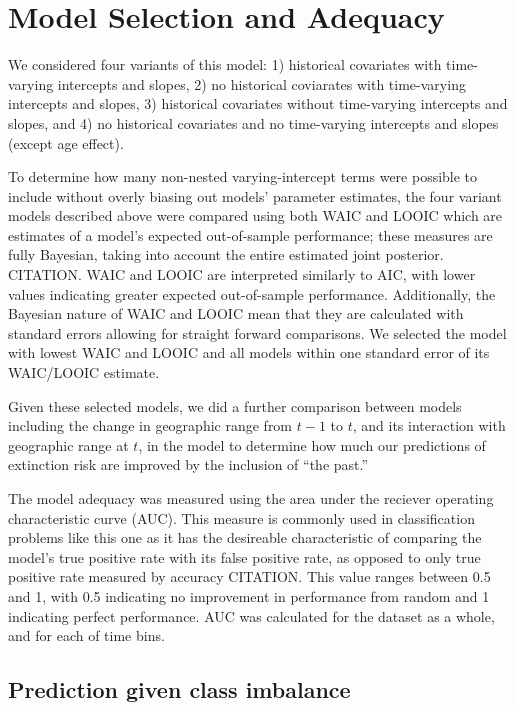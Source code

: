 \documentclass[12pt,letterpaper]{article}
\begin{document}
\section{Model Selection and Adequacy}

We considered four variants of this model: 1) historical covariates with time-varying intercepts and slopes, 2) no historical coviarates with time-varying intercepts and slopes, 3) historical covariates without time-varying intercepts and slopes, and 4) no historical covariates and no time-varying intercepts and slopes (except age effect).

To determine how many non-nested varying-intercept terms were possible to include without overly biasing out models' parameter estimates, the four variant models described above were compared using both WAIC and LOOIC which are estimates of a model's expected out-of-sample performance; these measures are fully Bayesian, taking into account the entire estimated joint posterior. CITATION. WAIC and LOOIC are interpreted similarly to AIC, with lower values indicating greater expected out-of-sample performance. Additionally, the Bayesian nature of WAIC and LOOIC mean that they are calculated with standard errors allowing for straight forward comparisons. We selected the model with lowest WAIC and LOOIC and all models within one standard error of its WAIC/LOOIC estimate.

Given these selected models, we did a further comparison between models including the change in geographic range from \(t - 1\) to \(t\), and its interaction with geographic range at \(t\), in the model to determine how much our predictions of extinction risk are improved by the inclusion of ``the past.''

The model adequacy was measured using the area under the reciever operating characteristic curve (AUC). This measure is commonly used in classification problems like this one as it has the desireable characteristic of comparing the model's true positive rate with its false positive rate, as opposed to only true positive rate measured by accuracy CITATION. This value ranges between 0.5 and 1, with 0.5 indicating no improvement in performance from random and 1 indicating perfect performance. AUC was calculated for the dataset as a whole, and for each of time bins.


\subsection{Prediction given class imbalance}
\end{document}
